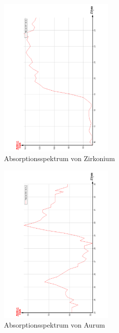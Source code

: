 \begin{figure}
  \centering
  \includegraphics[width=0.5\textwidth, angle=270]{bilder/AbsorpZr.pdf}
  \caption{Absorptionsspektrum von Zirkonium}
  \label{fig:Zirkonium}
\end{figure}

\begin{figure}
  \centering
  \includegraphics[width=0.5\textwidth, angle=270]{bilder/AbsorpAu.pdf}
  \caption{Absorptionsspektrum von Aurum}
  \label{fig:Aurum}
\end{figure}
